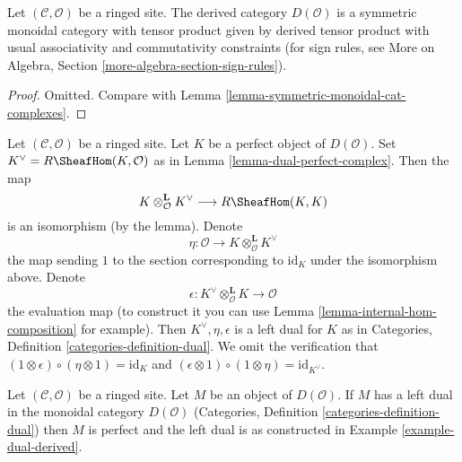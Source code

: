 \begin{lemma}
\label{lemma-symmetric-monoidal-derived}
Let $(\mathcal{C}, \mathcal{O})$ be a ringed site. The derived category
$D(\mathcal{O})$ is a symmetric monoidal category with tensor product
given by derived tensor product with usual associativity and
commutativity constraints (for sign rules, see
More on Algebra, Section \ref{more-algebra-section-sign-rules}).
\end{lemma}

\begin{proof}
Omitted. Compare with Lemma \ref{lemma-symmetric-monoidal-cat-complexes}.
\end{proof}

\begin{example}
\label{example-dual-derived}
Let $(\mathcal{C}, \mathcal{O})$ be a ringed site. Let $K$ be a perfect object
of $D(\mathcal{O})$. Set $K^\vee = R\SheafHom(K, \mathcal{O})$
as in Lemma \ref{lemma-dual-perfect-complex}.
Then the map
$$
K \otimes_\mathcal{O}^\mathbf{L} K^\vee \longrightarrow R\SheafHom(K, K)
$$
is an isomorphism (by the lemma). Denote
$$
\eta :
\mathcal{O}
\longrightarrow
K \otimes_\mathcal{O}^\mathbf{L} K^\vee
$$
the map sending $1$ to the section corresponding to
$\text{id}_K$ under the isomorphism above.
Denote
$$
\epsilon : 
K^\vee
\otimes_\mathcal{O}^\mathbf{L} K
\longrightarrow
\mathcal{O}
$$
the evaluation map (to construct it you can use
Lemma \ref{lemma-internal-hom-composition} for example). Then
$K^\vee, \eta, \epsilon$ is a left dual for $K$ as in
Categories, Definition \ref{categories-definition-dual}.
We omit the verification that
$(1 \otimes \epsilon) \circ (\eta \otimes 1) = \text{id}_K$
and
$(\epsilon \otimes 1) \circ (1 \otimes \eta) =
\text{id}_{K^\vee}$.
\end{example}

\begin{lemma}
\label{lemma-left-dual-derived}
Let $(\mathcal{C}, \mathcal{O})$ be a ringed site. Let $M$ be an object
of $D(\mathcal{O})$. If $M$ has a left dual in the monoidal category
$D(\mathcal{O})$ (Categories, Definition \ref{categories-definition-dual})
then $M$ is perfect and the left dual is as constructed in
Example \ref{example-dual-derived}.
\end{lemma}

